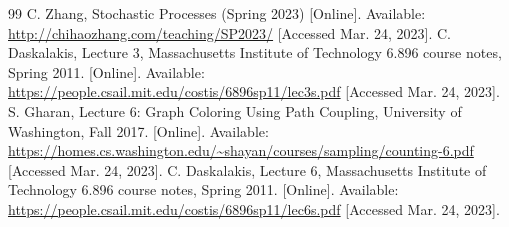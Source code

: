 \documentclass{article}
\theoremstyle{definition}
\begin{document}
	\begin{thebibliography}{99}
		 C. Zhang, Stochastic Processes (Spring 2023) [Online]. Available: \url{http://chihaozhang.com/teaching/SP2023/} [Accessed Mar. 24, 2023].
		 C. Daskalakis, Lecture 3, Massachusetts Institute of Technology 6.896 course notes, Spring 2011. [Online]. Available: \url{https://people.csail.mit.edu/costis/6896sp11/lec3s.pdf} [Accessed Mar. 24, 2023].
		 S. Gharan, Lecture 6: Graph Coloring Using Path Coupling, University of Washington, Fall 2017. [Online]. Available: \url{https://homes.cs.washington.edu/~shayan/courses/sampling/counting-6.pdf} [Accessed Mar. 24, 2023].
		 C. Daskalakis, Lecture 6, Massachusetts Institute of Technology 6.896 course notes, Spring 2011. [Online]. Available: \url{https://people.csail.mit.edu/costis/6896sp11/lec6s.pdf} [Accessed Mar. 24, 2023].
	\end{thebibliography}
\end{document}
